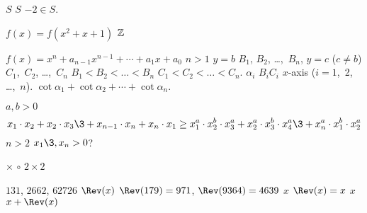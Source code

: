                        $S$                 $S$             $-2 \in S.$





\prob %
                        $f(x)=f(x^2+x+1)$            ${\Bbb Z}$   
                                                                            
     



\prob  %
                          $f(x)=x^n+a_{n-1}x^{n-1}+\cdots+a_1x+a_0$       
$n>1$                      
     $y=b$               $B_1$, $B_2$, \dots,~$B_n$,             
     $y=c$ ($c\ne b$)               $C_1$,~$C_2$, \dots,~$C_n$      
$B_1<B_2<\dots<B_n$    
$C_1<C_2<\dots<C_n$.     $\alpha_i$                               $B_iC_i$
        $x$-axis ($i=1$,~2, \dots,~$n$).
             $\cot\alpha_1+\cot\alpha_2+\cdots+\cot\alpha_n$.




\prob   %
          $a,b>0$                    
  $$x_1\cdot x_2+x_2\cdot x_3\3+x_{n-1}\cdot x_n+x_n\cdot x_1
    \ge x_1^a\cdot x_2^b\cdot x_3^a+x_2^a\cdot x_3^b\cdot 
        x_4^a\3+x_n^a\cdot x_1^b\cdot x_2^a$$
                             $n>2$           $x_1\3,x_n>0$?



\prob %
                                                                   
                 $\times$            $\circ$                      
  $2\times 2$                                                    
           



\prob   %
                                                                     
     $131$, $2662$, $62726$       $\Rev(x)$                                   
                         $\Rev(179)=971$, $\Rev(9364)=4639$                 
                 $x$           $\Rev(x)=x$             $x$     $x+\Rev(x)$
            




                                                                      
                                      
                                                              
                                                          
                                                                  
